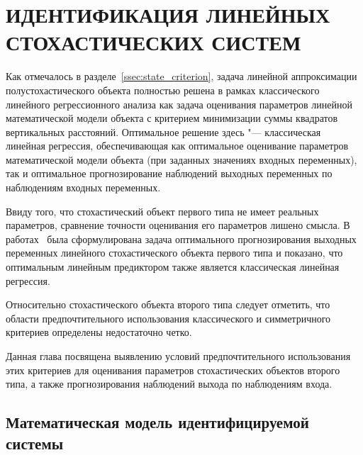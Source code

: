 \chapter[Идентификация линейных стохастических систем второго типа]{%
  ИДЕНТИФИКАЦИЯ ЛИНЕЙНЫХ СТОХАСТИЧЕСКИХ СИСТЕМ
}

Как отмечалось в разделе~\ref{ssec:state_criterion},
задача линейной аппроксимации полустохастического объекта полностью решена в
рамках классического линейного регрессионного анализа как задача оценивания параметров
линейной математической модели объекта с критерием минимизации суммы квадратов вертикальных расстояний.
Оптимальное решение здесь "--- классическая линейная регрессия,
обеспечивающая как оптимальное оценивание параметров математической модели объекта
(при заданных значениях входных переменных),
так и оптимальное прогнозирование наблюдений выходных переменных по наблюдениям входных переменных.

Ввиду того, что стохастический объект первого типа не имеет реальных параметров,
сравнение точности оценивания его параметров лишено смысла.
В работах~\cite{mukha_2010, mukha_2011} была сформулирована задача оптимального прогнозирования
выходных переменных линейного стохастического объекта первого типа и показано,
что оптимальным линейным предиктором также является классическая линейная регрессия.

Относительно стохастического объекта второго типа следует отметить,
что области предпочтительного использования классического и симметричного критериев
определены недостаточно четко.

Данная глава посвящена выявлению условий предпочтительного использования этих критериев
для оценивания параметров стохастических объектов второго типа,
а также прогнозирования наблюдений выхода по наблюдениям входа.

\section{Математическая модель идентифицируемой системы}

